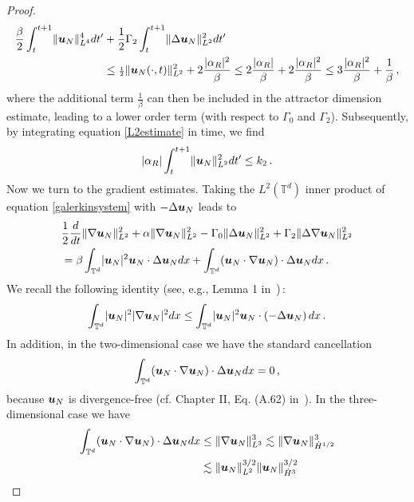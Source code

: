 \documentclass[11pt]{amsart}
\newcommand{\bu}{\mbox{\boldmath$u$}}
\newcommand{\Rb}{\beta}
\newcommand{\Gamzero}{\Gamma_{0}}
\newcommand{\Gamtwo}{\Gamma_{2}}
\newcommand\shalf{\ensuremath{{\scriptstyle\frac{1}{2}}}}
\theoremstyle{definition}
\numberwithin{equation}{section}
\numberwithin{equation}{section}
\begin{document}
\begin{proof}
\begin{align} 
\frac{\Rb}{2} \int_t^{t+1} \lVert \bu_N \rVert_{L^4}^4 dt' &+ \frac{1}{2} \Gamtwo \int_t^{t+1} \lVert \Delta \bu_N \rVert_{L^2}^2 dt' \nonumber \\
&\leq \shalf \lVert \bu_N (\cdot, t) \rVert_{L^2}^2 + 2 \frac{\lvert \alpha_{R} \rvert^2}{\Rb} \leq 2
\frac{\lvert \alpha_{R} \rvert}{\Rb} + 2
\frac{\lvert \alpha_{R} \rvert^2}{\Rb} \leq 3
\frac{\lvert \alpha_{R} \rvert^2}{\Rb} + \frac{1}{\Rb}\,, 
\end{align}
where the additional term $\frac{1}{\Rb}$ can then be included in the attractor dimension estimate, leading to a lower order term (with respect to $\Gamzero$ and $\Gamtwo$). Subsequently, by integrating equation \eqref{L2estimate} in time, we find
\begin{equation} \label{L2absorbingball2}
\lvert \alpha_{R} \rvert \int_t^{t+1} \lVert \bu_N \rVert_{L^2}^2 dt' \leq k_2\,.
\end{equation}
Now we turn to the gradient estimates. Taking the $L^2 (\mathbb{T}^d)$ inner product of equation \eqref{galerkinsystem} with $-\Delta \bu_N$ leads to
\begin{align*}
&\frac{1}{2} \frac{d}{d t} \lVert \nabla \bu_N \rVert_{L^2}^2 + \alpha \lVert \nabla \bu_N \rVert_{L^2}^2 - \Gamzero \lVert \Delta \bu_N \rVert_{L^2}^2 + \Gamtwo \lVert \Delta \nabla \bu_N \rVert_{L^2}^2 \\
&= \Rb \int_{\mathbb{T}^d} \lvert \bu_N \rvert^2 \bu_N \cdot \Delta \bu_N dx + \int_{\mathbb{T}^d} (\bu_N \cdot \nabla \bu_N) \cdot \Delta \bu_N dx\,.
\end{align*}
We recall the following identity (see, e.g., Lemma 1 in~\cite{robinson2014})\,:
\begin{equation*}
\int_{\mathbb{T}^d} \lvert \bu_N \rvert^2 \lvert \nabla \bu_N \rvert^2 dx \leq \int_{\mathbb{T}^d} \lvert \bu_N \rvert^2 \bu_N 
\cdot\left(-\Delta \bu_N\right)dx\,.
\end{equation*}
In addition, in the two-dimensional case we have the standard cancellation 
\begin{equation} \label{2dcancellation}
\int_{\mathbb{T}^d} (\bu_N \cdot \nabla \bu_N) \cdot \Delta \bu_N dx = 0\,,
\end{equation}
because $\bu_N$ is divergence-free (cf. Chapter II, Eq. (A.62) in~\cite{foias2001}). In the three-dimensional case we have
\begin{align*}
\int_{\mathbb{T}^d} (\bu_N \cdot \nabla \bu_N) \cdot \Delta \bu_N dx &\leq \lVert \nabla \bu_N \rVert_{L^3}^3 \lesssim \lVert \nabla \bu_N \rVert_{\dot{H}^{1/2}}^3\\ &\lesssim \lVert \bu_N \rVert_{L^2}^{3/2} \lVert \bu_N \rVert_{\dot{H}^3}^{3/2} \\

\end{align*}
\end{proof}
\end{document}
